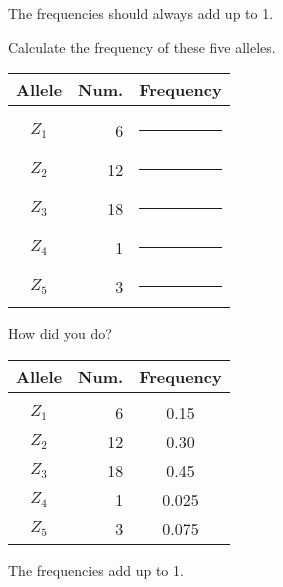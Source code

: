 \documentclass[t,handout]{beamer}  %
\begin{document}
%
\begin{frame}{The frequencies should always add up to 1.}
	
	
\end{frame}
%

\begin{frame}[t]{Calculate the frequency of these five alleles.}
	
	\begin{longtable}[c]{@{}crc@{}}
		\toprule
		Allele	& Num.  & Frequency \tabularnewline
		\midrule
		& & \tabularnewline[-1ex]
		$Z_1$ & 6 & \rule{0.5in}{0.4pt} \tabularnewline[1.5ex]
		$Z_2$ & 12 & \rule{0.5in}{0.4pt} \tabularnewline[1.5ex]
		$Z_3$ & 18 & \rule{0.5in}{0.4pt} \tabularnewline[1.5ex]
		$Z_4$ & 1 & \rule{0.5in}{0.4pt} \tabularnewline[1.5ex]
		$Z_5$ & 3 & \rule{0.5in}{0.4pt} \tabularnewline[1.5ex]
		\bottomrule
	\end{longtable}
\end{frame}
%

\begin{frame}[t]{How did you do?}
	
	\begin{longtable}[c]{@{}crc@{}}
		\toprule
		Allele	& Num.  & Frequency \tabularnewline
		\midrule
		& & \tabularnewline[-1ex]
		$Z_1$ & 6 & {0.15} \tabularnewline[1.5ex]
		$Z_2$ & 12 & {0.30} \tabularnewline[1.5ex]
		$Z_3$ & 18 & {0.45} \tabularnewline[1.5ex]
		$Z_4$ & 1 & {0.025} \tabularnewline[1.5ex]
		$Z_5$ & 3 & {0.075} \tabularnewline[1.5ex]
		\bottomrule
	\end{longtable}
\end{frame}
%
\begin{frame}{The frequencies add up to 1.}
	
	
\end{frame}
\end{document}
